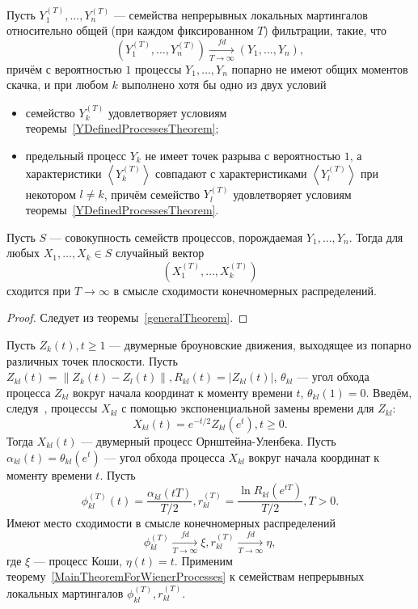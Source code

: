 \documentclass[12pt, a4paper, titlepage]{article}
\begin{document}
\begin{theorem}\label{MainTheoremForWienerProcesses}
 Пусть $Y_1^{(T)}, \ldots, Y_n^{(T)}$ --- семейства непрерывных локальных мартингалов относительно общей
(при каждом фиксированном $T$) фильтрации, такие, что 
$$(Y_1^{(T)}, \ldots, Y_n^{(T)})\xrightarrow[T \to \infty]{fd} (Y_1, \ldots, Y_n),$$
причём с вероятностью $1$ процессы
$Y_1, \ldots, Y_n$
попарно не имеют общих моментов скачка, и
при любом $k$ выполнено хотя бы одно из двух условий
\begin{itemize}
 \item семейство $Y_k^{(T)}$ удовлетворяет условиям 
теоремы~\ref{YDefinedProcessesTheorem};
 \item предельный процесс $Y_k$ 
не имеет точек разрыва с вероятностью $1$,
а характеристики $\left<Y_k^{(T)}\right>$ совпадают с характеристиками
$\left<Y_l^{(T)}\right>$ при некотором $l \ne k$, причём
семейство $Y_l^{(T)}$ удовлетворяет условиям 
теоремы~\ref{YDefinedProcessesTheorem}. 
\end{itemize}
Пусть $S$ --- совокупность семейств процессов, порождаемая $Y_1, \ldots, Y_n$.
Тогда для любых $X_1, \ldots, X_k \in S$ случайный вектор
$$(X_1^{(T)}, \ldots, X_k^{(T)})$$
сходится при $T \to \infty$ в смысле сходимости конечномерных распределений. 
\end{theorem}
\begin{proof}
 Следует из теоремы~\ref{generalTheorem}.  
\end{proof}

Пусть $Z_k(t), t \ge 1$ --- двумерные броуновские движения, выходящее из попарно различных
точек плоскости. Пусть $Z_{kl}(t)=\|Z_k(t)-Z_l(t)\|, R_{kl}(t)=|Z_{kl}(t)|$,
$\theta_{kl}$ --- угол обхода процесса $Z_{kl}$ вокруг начала координат 
к моменту времени $t$, $\theta_{kl}(1)=0.$
Введём, следуя~\cite{BertoinWerner}, процессы $X_{kl}$ с помощью экспоненциальной замены времени
для $Z_{kl}$:
$$X_{kl}(t)=e^{-t/2}Z_{kl}(e^t), t \ge 0.$$
Тогда $X_{kl}(t)$ --- двумерный процесс Орнштейна-Уленбека. 
Пусть $\alpha_{kl}(t)=\theta_{kl}(e^t)$ --- угол обхода процесса $X_{kl}$ вокруг начала координат 
к моменту времени $t$. Пусть 
$$\phi_{kl}^{(T)}(t)=\frac{\alpha_{kl}(tT)}{T/2}, 
r_{kl}^{(T)}=\frac{\ln{R_{kl}(e^{tT})}}{T/2}, T>0.$$
Имеют место сходимости в смысле конечномерных распределений
$$\phi_{kl}^{(T)}\xrightarrow[T \to \infty]{fd}\xi, r_{kl}^{(T)}\xrightarrow[T \to \infty]{fd}\eta,$$
где $\xi$ --- процесс Коши, $\eta(t)=t.$
Применим теорему~\ref{MainTheoremForWienerProcesses} к семействам непрерывных локальных мартингалов
$\phi_{kl}^{(T)}, r_{kl}^{(T)}.$
\end{document}
